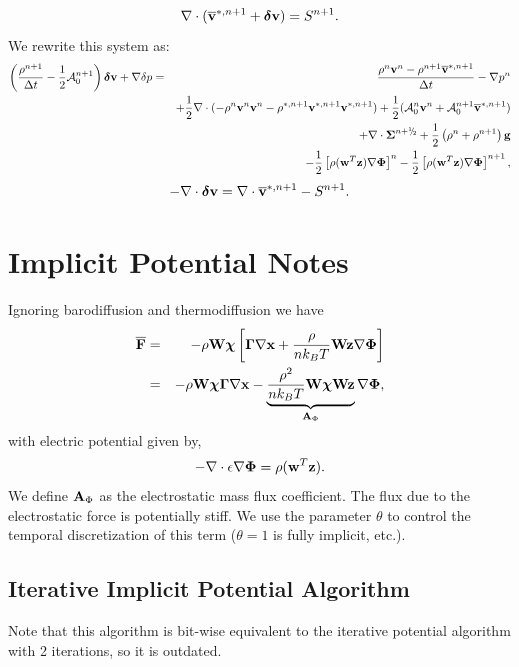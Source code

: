\documentclass[final]{siamltex}
\newcommand{\sfrac}[2]{\mathchoice
  {\kern0em\raise.5ex\hbox{\the\scriptfont0 #1}\kern-.15em/
   \kern-.15em\lower.25ex\hbox{\the\scriptfont0 #2}}
  {\kern0em\raise.5ex\hbox{\the\scriptfont0 #1}\kern-.15em/
   \kern-.15em\lower.25ex\hbox{\the\scriptfont0 #2}}
  {\kern0em\raise.5ex\hbox{\the\scriptscriptfont0 #1}\kern-.2em/
   \kern-.15em\lower.25ex\hbox{\the\scriptscriptfont0 #2}}
  {#1\!/#2}}
\def\Ab {{\bf A}}
\def\Fb {{\bf F}}
\def\gb {{\bf g}}
\def\vb {{\bf v}}
\def\wb {{\bf w}}
\def\Wb {{\bf W}}
\def\xb {{\bf x}}
\def\zb {{\bf z}}
\def\chib   {\boldsymbol{\chi}}
\def\deltab {\boldsymbol{\delta}}
\def\Gammab {\boldsymbol{\Gamma}}
\def\Phib   {\boldsymbol{\Phi}}
\def\Sigmab {\boldsymbol{\Sigma}}
\def\half   {\frac{1}{2}}
\def\myhalf {\sfrac{1}{2}}
\begin{document}
\begin{equation}
\nabla\cdot(\overline\vb^{*,n+1} + \deltab\vb) = S^{n+1}.
\end{equation}
We rewrite this system as:
\begin{eqnarray}
\left(\frac{\rho^{n+1}}{\Delta t} - \half\mathcal{A}_0^{n+1}\right)\deltab\vb + \nabla\delta p &=& \frac{\rho^n\vb^n-\rho^{n+1}\overline\vb^{*,n+1}}{\Delta t} -\nabla p^n\nonumber\\
&&+ \half\nabla\cdot(-\rho^n\vb^n\vb^n - \rho^{*,n+1}\vb^{*,n+1}\vb^{*,n+1}) + \half(\mathcal{A}_0^n\vb^n + \mathcal{A}_0^{n+1}\overline\vb^{*,n+1} )\nonumber\\
&&+ \nabla\cdot\Sigmab^{n+\myhalf} + \half\left(\rho^n+\rho^{n+1}\right)\gb\nonumber\\
&&- \half\left[\rho(\wb^T\zb)\nabla\Phib\right]^n - \half\left[\rho(\wb^T\zb)\nabla\Phib\right]^{n+1},
\end{eqnarray}
\begin{equation}
-\nabla\cdot\deltab\vb = \nabla\cdot\overline\vb^{*,n+1} - S^{n+1}.
\end{equation}

\section{Implicit Potential Notes}
Ignoring barodiffusion and thermodiffusion we have
\begin{eqnarray}
\overline{\Fb} &=& -\rho\Wb\chib\left[\Gammab\nabla\xb + \frac{\rho}{n k_B T}\Wb\zb\nabla\Phib\right]\nonumber\\
&=& -\rho\Wb\chib\Gammab\nabla\xb - \underbrace{\frac{\rho^2}{nk_B T}\Wb\chib\Wb\zb}_{\Ab_\Phi}\nabla\Phib,
\end{eqnarray}
with electric potential given by,
\begin{equation}
-\nabla\cdot\epsilon\nabla\Phib = \rho(\wb^T\zb).
\end{equation}
We define $\Ab_\Phi$ as the electrostatic mass flux coefficient.
The flux due to the electrostatic force is potentially stiff.  We
use the parameter $\theta$ to control the temporal discretization of this term
($\theta=1$ is fully implicit, etc.).

\subsection{Iterative Implicit Potential Algorithm}
Note that this algorithm is bit-wise equivalent to the iterative potential 
algorithm with 2 iterations, so it is outdated.
\end{document}
